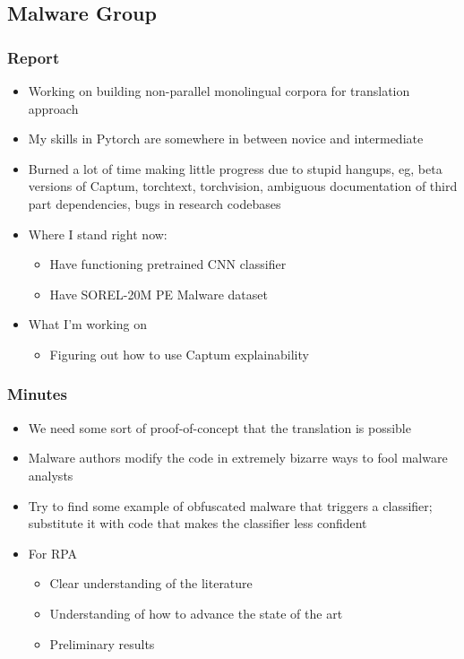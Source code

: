 \documentclass{article}
\begin{document}
\subsection*{Malware Group}
\subsubsection*{Report}
\begin{itemize}
	\item Working on building non-parallel monolingual corpora for translation approach
	\item My skills in Pytorch are somewhere in between novice and intermediate
	\item Burned a lot of time making little progress due to stupid hangups, eg, beta versions of Captum, torchtext, torchvision, ambiguous documentation of third part dependencies, bugs in research codebases
	\item Where I stand right now:
	\begin{itemize}
		\item Have functioning pretrained CNN classifier
		\item Have SOREL-20M PE Malware dataset
	\end{itemize}
	\item What I'm working on
	\begin{itemize}
		\item Figuring out how to use Captum explainability 
	\end{itemize}
\end{itemize}
\subsubsection*{Minutes}
\begin{itemize}
	\item We need some sort of proof-of-concept that the translation is possible 
	\item Malware authors modify the code in extremely bizarre ways to fool malware analysts
	\item Try to find some example of obfuscated malware that triggers a classifier; substitute it with code that makes the classifier less confident
	\item For RPA
	\begin{itemize}
		\item Clear understanding of the literature
		\item Understanding of how to advance the state of the art
		\item Preliminary results
	\end{itemize}
\end{itemize}
\end{document}
